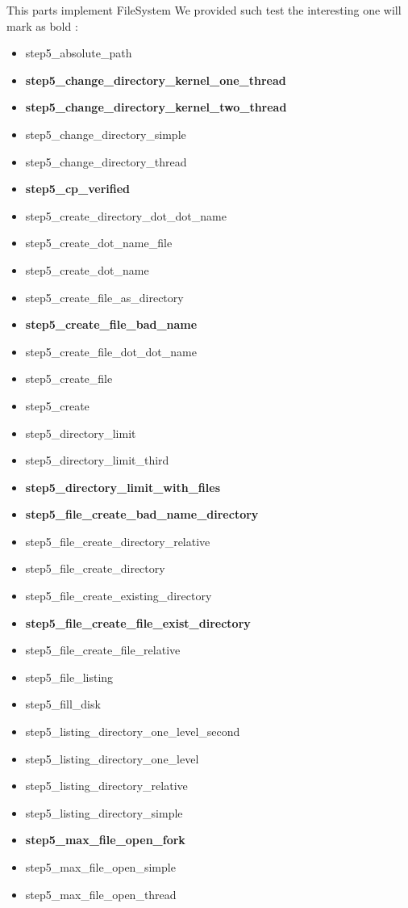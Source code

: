 \documentclass[a4paper,10pt]{article}
\begin{document}
This parts implement FileSystem We provided such test the interesting one will mark as bold :
\begin{itemize}
\item step5_absolute_path
\item {\bf step5_change_directory_kernel_one_thread}
\item {\bf step5_change_directory_kernel_two_thread}
\item step5_change_directory_simple
\item step5_change_directory_thread
\item {\bf step5_cp_verified}
\item step5_create_directory_dot_dot_name
\item step5_create_dot_name_file
\item step5_create_dot_name
\item step5_create_file_as_directory
\item {\bf step5_create_file_bad_name}
\item step5_create_file_dot_dot_name
\item step5_create_file
\item step5_create
\item step5_directory_limit
\item step5_directory_limit_third
\item {\bf step5_directory_limit_with_files}
\item {\bf step5_file_create_bad_name_directory}
\item step5_file_create_directory_relative
\item step5_file_create_directory
\item step5_file_create_existing_directory
\item {\bf step5_file_create_file_exist_directory}
\item step5_file_create_file_relative
\item step5_file_listing
\item step5_fill_disk
\item step5_listing_directory_one_level_second
\item step5_listing_directory_one_level
\item step5_listing_directory_relative
\item step5_listing_directory_simple
\item {\bf step5_max_file_open_fork}
\item step5_max_file_open_simple
\item step5_max_file_open_thread

\end{itemize}
\end{document}
